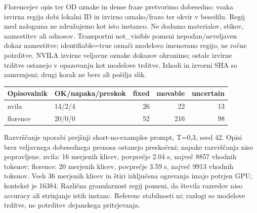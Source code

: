 Florencejev opis ter OD oznake in dense fraze pretvorimo dobesedno: vsaka izvirna regija dobi lokalni ID in izvirno oznako/frazo ter okvir v besedilu. Regij med nalogama ne združujemo kot isto instanco. Ne dodamo materialov, stikov, namestitev ali odnosov. Transportni not\_visible pomeni nepodan/neveljaven dokaz namestitve; identifiable=true označi modelovo imenovano regijo, ne ročne potrditve. NVILA izvirne veljavne oznake dokazov ohranimo; ostale izvirne trditve ostanejo v opazovanju kot modelove trditve. Izhodi in izvorni SHA so zamrznjeni; drugi korak ne bere ali pošilja slik.
\begin{center}\small\begin{tabular}{p{3cm}p{4cm}rrr}\toprule
Opisovalnik & OK/napaka/preskok & fixed & movable & uncertain \\ \midrule
nvila & 14/2/4 & 26 & 22 & 13 \\
florence & 20/0/0 & 52 & 216 & 98 \\
\bottomrule\end{tabular}\end{center}

Razvrščanje uporabi prejšnji short-no-examples prompt, T=0,3, seed 42. Opisi brez veljavnega dobesednega prenosa ostanejo preskočeni; napake razvrščanja niso popravljene. nvila: 16 merjenih klicev, povprečje 2.04 s, največ 8857 vhodnih tokenov; florence: 20 merjenih klicev, povprečje 3.59 s, največ 9913 vhodnih tokenov. Vseh 36 merjenih klicev in štiri izključena ogrevanja imajo potrjen GPU; kontekst je 16384. Različna granularnost regij pomeni, da števila razredov niso accuracy ali strinjanje istih instanc. Referenc stabilnosti ni; razlogi so modelove trditve, ne potrditev dejanskega pritrjevanja.

\newpage
